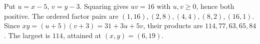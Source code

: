 Put $u=x-5$, $v=y-3$. Squaring gives $uv=16$ with $u,v\ge0$, hence both positive. The ordered factor pairs are $(1,16),(2,8),(4,4),(8,2),(16,1)$. Since $xy=(u+5)(v+3)=31+3u+5v$, their products are $114,77,63,65,84$. The largest is $\boxed{114}$, attained at $(x,y)=(6,19)$.
